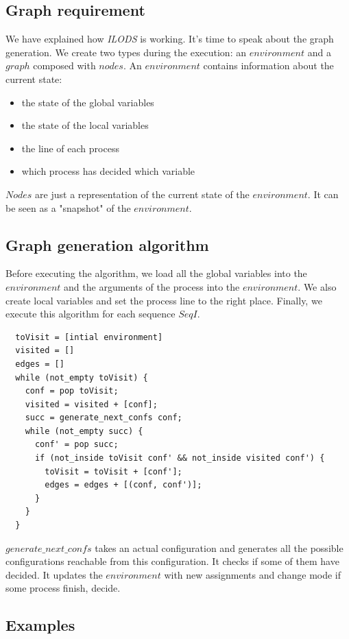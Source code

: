 \documentclass{article}
\begin{document}
\subsection{Graph requirement}
We have explained how \textit{ILODS} is working. It's time to speak about the graph generation. We create two types during the execution: an $environment$ and a $graph$ composed with $nodes$. An $environment$ contains information about the current state:
\begin{itemize}
  \item the state of the global variables
  \item the state of the local variables
  \item the line of each process
  \item which process has decided which variable
\end{itemize}
$Nodes$ are just a representation of the current state of the $environment$. It can be seen as a "snapshot" of the $environment$.



\subsection{Graph generation algorithm}
Before executing the algorithm, we load all the global variables into the $environment$ and the arguments of the process into the $environment$. We also create local variables and set the process line to the right place. Finally, we execute this algorithm for each sequence $SeqI$.
\begin{lstlisting}
  toVisit = [intial environment]
  visited = []
  edges = []
  while (not_empty toVisit) {
    conf = pop toVisit;
    visited = visited + [conf];
    succ = generate_next_confs conf;
    while (not_empty succ) {
      conf' = pop succ;
      if (not_inside toVisit conf' && not_inside visited conf') {
        toVisit = toVisit + [conf'];
        edges = edges + [(conf, conf')];
      }
    }
  }
\end{lstlisting}
$generate\_next\_confs$ takes an actual configuration and generates all the possible configurations reachable from this configuration. It checks if some of them have decided. It updates the $environment$ with new assignments and change mode if some process finish, decide.


\subsection{Examples}
\end{document}
